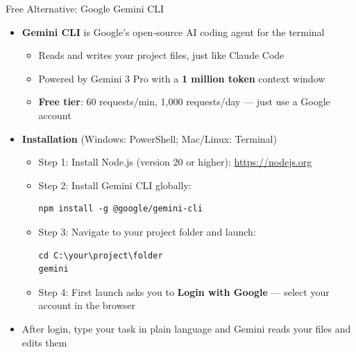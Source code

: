 \documentclass[hyperref={pdfpagelabels=false}]{beamer}
\begin{document}
\begin{frame}[fragile]{Free Alternative: Google Gemini CLI}

\begin{itemize}
	\item \textbf{Gemini CLI} is Google's open-source AI coding agent for the terminal
	\vspace{0.15cm}
	\begin{itemize}
		\item Reads and writes your project files, just like Claude Code
		\vspace{0.1cm}
		\item Powered by Gemini 3 Pro with a \textbf{1 million token} context window
		\vspace{0.1cm}
		\item \textbf{Free tier}: 60 requests/min, 1,000 requests/day --- just use a Google account
	\end{itemize}
	\vspace{0.3cm}
	\item \textbf{Installation} (Windows: PowerShell; Mac/Linux: Terminal)
	\vspace{0.1cm}
	\begin{itemize}
		\item Step 1: Install Node.js (version 20 or higher): \url{https://nodejs.org}
		\vspace{0.1cm}
		\item Step 2: Install Gemini CLI globally:
\begin{lstlisting}[style=nonumbers, basicstyle=\small\ttfamily, frame=single]
npm install -g @google/gemini-cli
\end{lstlisting}
		\item Step 3: Navigate to your project folder and launch:
\begin{lstlisting}[style=nonumbers, basicstyle=\small\ttfamily, frame=single]
cd C:\your\project\folder
gemini
\end{lstlisting}
		\item Step 4: First launch asks you to \textbf{Login with Google} --- select your account in the browser
	\end{itemize}
	\vspace{0.2cm}
	\item After login, type your task in plain language and Gemini reads your files and edits them
\end{itemize}

\end{frame}
\end{document}
